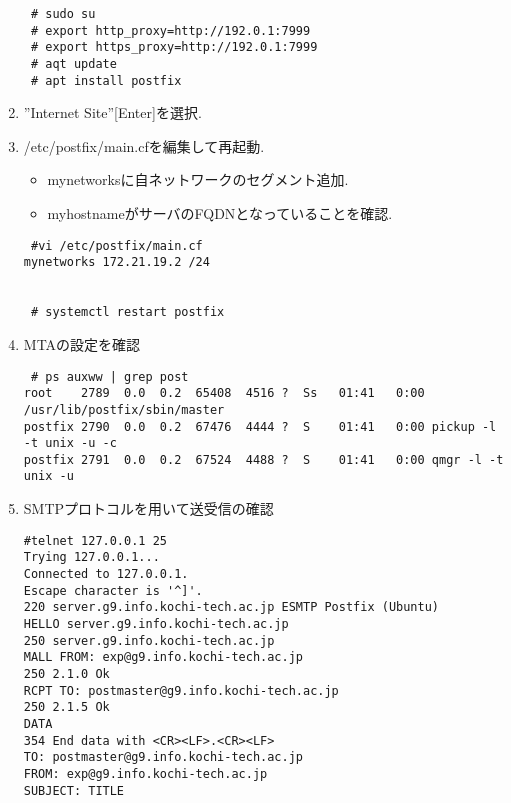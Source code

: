 \documentclass[a4j,titlepage]{jarticle}
\begin{document}
\begin{enumerate}
  \begin{center}
    \begin{screen}
\begin{verbatim}
 # sudo su
 # export http_proxy=http://192.0.1:7999
 # export https_proxy=http://192.0.1:7999
 # aqt update
 # apt install postfix 
\end{verbatim}
    \end{screen}
  \end{center}
  
\item ''Internet Site''[Enter]を選択.
\item /etc/postfix/main.cfを編集して再起動.
  \begin{itemize}
  \item mynetworksに自ネットワークのセグメント追加.
  \item myhostnameがサーバのFQDNとなっていることを確認.
  \end{itemize}
  
  \begin{center}
    \begin{screen}
\begin{verbatim}
 #vi /etc/postfix/main.cf
mynetworks 172.21.19.2 /24 


 # systemctl restart postfix
\end{verbatim}
    \end{screen}
    \end{center}
\item MTAの設定を確認
  \begin{center}
    \begin{screen}
\begin{verbatim}
 # ps auxww | grep post
root    2789  0.0  0.2  65408  4516 ?  Ss   01:41   0:00 /usr/lib/postfix/sbin/master
postfix 2790  0.0  0.2  67476  4444 ?  S    01:41   0:00 pickup -l -t unix -u -c
postfix 2791  0.0  0.2  67524  4488 ?  S    01:41   0:00 qmgr -l -t unix -u
\end{verbatim}
    \end{screen}
  \end{center}
\item SMTPプロトコルを用いて送受信の確認
  \begin{center}
    \begin{screen}
\begin{verbatim}
#telnet 127.0.0.1 25
Trying 127.0.0.1...
Connected to 127.0.0.1.
Escape character is '^]'.
220 server.g9.info.kochi-tech.ac.jp ESMTP Postfix (Ubuntu)
HELLO server.g9.info.kochi-tech.ac.jp
250 server.g9.info.kochi-tech.ac.jp
MALL FROM: exp@g9.info.kochi-tech.ac.jp
250 2.1.0 Ok
RCPT TO: postmaster@g9.info.kochi-tech.ac.jp
250 2.1.5 Ok
DATA
354 End data with <CR><LF>.<CR><LF>
TO: postmaster@g9.info.kochi-tech.ac.jp
FROM: exp@g9.info.kochi-tech.ac.jp
SUBJECT: TITLE


\end{verbatim}
\end{screen}
\end{center}
\end{enumerate}
\end{document}
